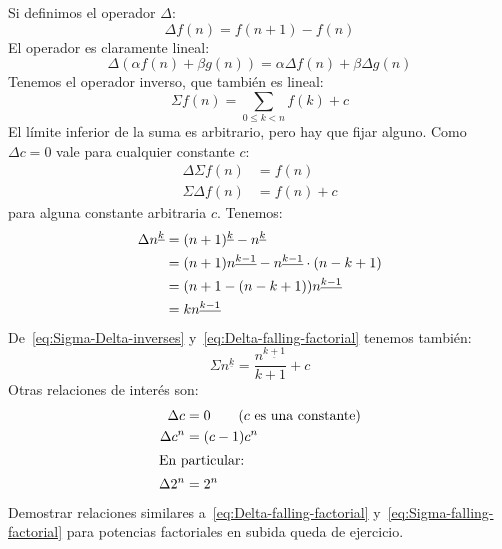   Si definimos el operador \(\Delta\):%
    \index{\(\Delta\)}
  \begin{equation}
    \label{eq:define-Delta}
    \Delta f(n)
      = f(n + 1) - f(n)
  \end{equation}
  El operador es claramente lineal:
  \begin{equation}
    \label{eq:Delta-lineal}
    \Delta ( \alpha f(n) + \beta g(n) )
      = \alpha \Delta f(n) + \beta \Delta g(n)
  \end{equation}
  Tenemos el operador inverso,
  que también es lineal:%
    \index{\(\Sigma\)}
  \begin{equation}
    \label{eq:define-Sigma}
    \Sigma f(n)
      = \sum_{0 \le k < n} f(k) + c
  \end{equation}
  El límite inferior de la suma es arbitrario,
  pero hay que fijar alguno.
  Como \(\Delta c = 0\) vale para cualquier constante \(c\):
  \begin{equation}
    \label{eq:Sigma-Delta-inverses}
    \begin{split}
      \Delta \Sigma f(n) &= f(n) \\
      \Sigma \Delta f(n) &= f(n) + c
    \end{split}
  \end{equation}
  para alguna constante arbitraria \(c\).
  Tenemos:
  \begin{align}
    \Delta n^{\underline{k}}
      &= (n + 1)^{\underline{k}} - n^{\underline{k}} \notag \\
      &= (n + 1) n^{\underline{k - 1}}
	    - n^{\underline{k - 1}} \cdot (n - k + 1) \notag \\
      &= (n + 1 - (n - k + 1)) n^{\underline{k - 1}} \notag \\
      &= k n^{\underline{k - 1}}
	   \label{eq:Delta-falling-factorial}
  \end{align}
  De~\eqref{eq:Sigma-Delta-inverses}
  y~\eqref{eq:Delta-falling-factorial}
  tenemos también:
  \begin{equation}
    \label{eq:Sigma-falling-factorial}
    \Sigma n^{\underline{k}}
      = \frac{n^{\underline{k + 1}}}{k + 1} + c
  \end{equation}
  Otras relaciones de interés son:
  \begin{align}
    \Delta c
      &= 0 \qquad \text{(\(c\) es una constante)}
	 \label{eq:Delta-constant} \\
    \Delta c^n
      &= (c - 1) c^n
	 \label{eq:Delta-c^n} \\
 \intertext{En particular:}
    \Delta 2^n
      &= 2^n
	 \label{eq:Delta-2^n}
  \end{align}
  Demostrar relaciones similares
  a~\eqref{eq:Delta-falling-factorial} y~\eqref{eq:Sigma-falling-factorial}
  para potencias factoriales en subida
  queda de ejercicio.

